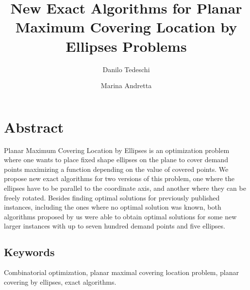 \documentclass[3p, 11pt]{elsarticle}
\begin{document}
	
	\begin{frontmatter}
		
		
		\title{New Exact Algorithms for Planar Maximum Covering Location by Ellipses Problems}
		
		\author[add1]{Danilo Tedeschi}

		
		\author[add1]{Marina Andretta}
					
		\address[add1]{Department of Applied Mathematics and Statistics, Institute of Mathematical and Computer Sciences, University of São Paulo, Avenida Trabalhador São-carlense, 400, Centro, 13566-590, São Carlos, SP, Brazil.}
		
\end{frontmatter}
\clearpage

\section*{Abstract}
			Planar Maximum Covering Location by Ellipses is an optimization problem where one wants to place fixed shape ellipses on the plane to cover demand points
			maximizing a function depending on the value of covered points.
			We propose new exact algorithms for two versions of this problem, one where the ellipses have to be parallel to the coordinate axis, and another where they can be freely rotated. 
			Besides finding optimal solutions for previously published instances, including the ones where no optimal solution was known, both algorithms proposed by us were able to obtain optimal solutions for some new larger instances 	with up to seven hundred demand points and five ellipses.
\subsection*{Keywords}
			Combinatorial optimization, planar maximal covering location problem, planar covering by ellipses, exact algorithms.
			
			
\end{document}
